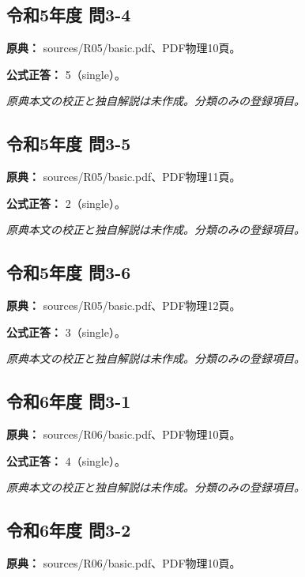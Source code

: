 \subsection{令和5年度 問3-4}
\label{q:r05-reg-basic-3-4}

\noindent\textbf{原典：} sources/R05/basic.pdf、PDF物理10頁。

\textbf{公式正答：} 5（single）。

\par\textit{原典本文の校正と独自解説は未作成。分類のみの登録項目。}

\subsection{令和5年度 問3-5}
\label{q:r05-reg-basic-3-5}

\noindent\textbf{原典：} sources/R05/basic.pdf、PDF物理11頁。

\textbf{公式正答：} 2（single）。

\par\textit{原典本文の校正と独自解説は未作成。分類のみの登録項目。}

\subsection{令和5年度 問3-6}
\label{q:r05-reg-basic-3-6}

\noindent\textbf{原典：} sources/R05/basic.pdf、PDF物理12頁。

\textbf{公式正答：} 3（single）。

\par\textit{原典本文の校正と独自解説は未作成。分類のみの登録項目。}

\subsection{令和6年度 問3-1}
\label{q:r06-reg-basic-3-1}

\noindent\textbf{原典：} sources/R06/basic.pdf、PDF物理10頁。

\textbf{公式正答：} 4（single）。

\par\textit{原典本文の校正と独自解説は未作成。分類のみの登録項目。}

\subsection{令和6年度 問3-2}
\label{q:r06-reg-basic-3-2}

\noindent\textbf{原典：} sources/R06/basic.pdf、PDF物理10頁。

